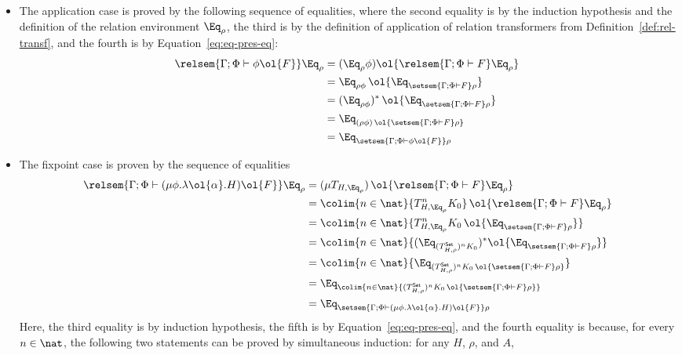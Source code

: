 \documentclass{lmcs}
\theoremstyle{plain}\newtheorem{satz}[thm]{Satz}
\newcommand{\set}{\mathsf{Set}}
\begin{document}
\begin{itemize}
\item The application case is proved by the following sequence of
  equalities, where the second equality is by the induction hypothesis
  and the definition of the relation environment $\Eq_\rho$, the third
  is by the definition of application of relation transformers from
  Definition~\ref{def:rel-transf}, and the fourth is by
  Equation~\ref{eq:eq-pres-eq}:
\[
\begin{split}
\relsem{\Gamma; \Phi \vdash \phi\ol{F}}\Eq_{\rho} &=
(\Eq_{\rho}\phi)\ol{\relsem{\Gamma; \Phi \vdash F}
\Eq_{\rho}}\\
&= \Eq_{\rho \phi}\, \ol{\Eq_{\setsem{\Gamma; \Phi \vdash F}
  \rho}}\\
&= (\Eq_{\rho \phi})^* \,\ol{\Eq_{\setsem{\Gamma; \Phi \vdash F}
  \rho}}\\
&= \Eq_{(\rho \phi) \,\ol{\setsem{\Gamma; \Phi \vdash F} \rho}}\\
&= \Eq_{\setsem{\Gamma; \Phi \vdash \phi\ol{F}}\rho}
\end{split}
\]
\item  The fixpoint case is proven by the sequence of equalities
\[
\begin{split}
\relsem{\Gamma; \Phi \vdash (\mu \phi.\lambda
  \ol{\alpha}. H)\ol{F}}\Eq_{\rho} 
&=(\mu {T_{H, \Eq_{\rho}}}) \,\ol{\relsem{\Gamma; \Phi \vdash F}\Eq_{\rho}}\\ 
&= \colim{n \in \nat}{T^n_{H, \Eq_{\rho}} K_0}\, \ol{\relsem{\Gamma; \Phi 
  \vdash F}\Eq_{\rho}}\\
&= \colim{n \in \nat}{ T^n_{H, \Eq_{\rho}} K_0 \,\ol{\Eq_{\setsem{\Gamma;
    \Phi \vdash F}\rho}}}\\
&= \colim{n \in \nat}{(\Eq_{(T^\set_{H,\rho})^n K_0})^*
  \ol{\Eq_{\setsem{\Gamma; \Phi \vdash F}\rho}}}\\
&= \colim{n \in \nat}{\Eq_{(T^\set_{H,\rho})^n K_0 \,\ol{\setsem{\Gamma;
        \Phi \vdash F}\rho}}}\\ 
&= \Eq_{\colim{n \in \nat}{ (T^\set_{H,\rho})^n K_0\,
    \ol{\setsem{\Gamma; \Phi \vdash F}\rho}}}\\
&= \Eq_{\setsem{\Gamma; \Phi \vdash (\mu \phi.\lambda
      \ol{\alpha}. H)\ol{F}}\rho}
\end{split}
\]
Here, the third equality is by induction hypothesis, the fifth is by
Equation~\ref{eq:eq-pres-eq}, and the fourth equality is because, for
every $n \in \nat$, the following two statements can be proved by
simultaneous induction: for any $H$, $\rho$, and $A$, 
\begin{equation}\label{eq:iel-fix-point-intermediate1}

\end{equation}
\end{itemize}
\end{document}
